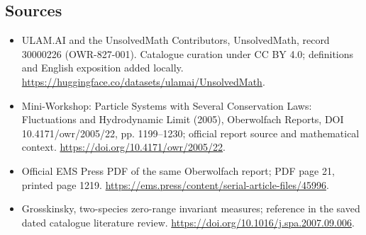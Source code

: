 \documentclass[11pt]{article}
\begin{document}
\subsection{Sources}
\begin{itemize}
\item[\hypertarget{source:30000226:1}{S1}] ULAM.AI and the UnsolvedMath Contributors, UnsolvedMath, record 30000226 (OWR-827-001). Catalogue curation under CC BY 4.0; definitions and English exposition added locally.
\url{https://huggingface.co/datasets/ulamai/UnsolvedMath}.
\item[\hypertarget{source:30000226:2}{S2}] Mini-Workshop: Particle Systems with Several Conservation Laws: Fluctuations and Hydrodynamic Limit (2005), Oberwolfach Reports, DOI 10.4171/owr/2005/22, pp. 1199--1230; official report source and mathematical context.
\url{https://doi.org/10.4171/owr/2005/22}.
\item[\hypertarget{source:30000226:3}{S3}] Official EMS Press PDF of the same Oberwolfach report; PDF page 21, printed page 1219.
\url{https://ems.press/content/serial-article-files/45996}.
\item[\hypertarget{source:30000226:4}{S4}] Grosskinsky, two-species zero-range invariant measures; reference in the saved dated catalogue literature review.
\url{https://doi.org/10.1016/j.spa.2007.09.006}.
\end{itemize}
\label{end:30000226}
\end{document}
